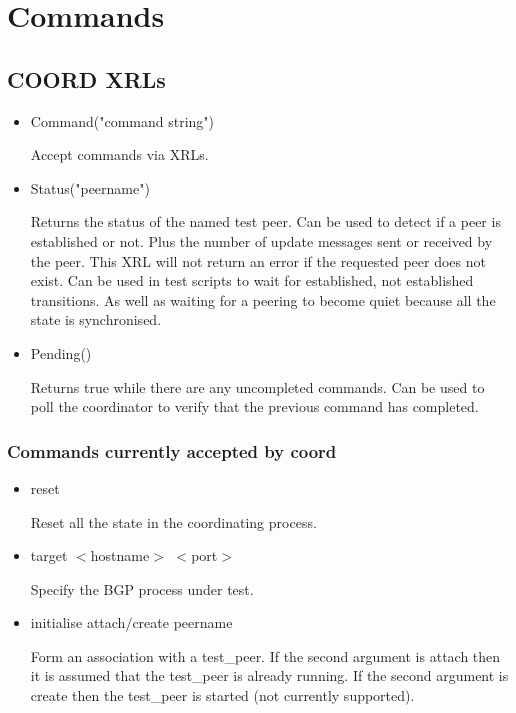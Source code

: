 \documentclass[11pt]{article}
\begin{document}
\section{Commands}

\subsection{\label{coord:command}COORD XRLs}
\begin{itemize}

\item Command("command string")

  Accept commands via XRLs.

\item Status("peername")

  Returns the status of the named test peer. Can be used to detect if a
  peer is established or not. Plus the number of update messages sent
  or received by the peer. This XRL will not return an error if the
  requested peer does not exist. Can be used in test scripts to wait
  for established, not established transitions. As well as waiting for
  a peering to become quiet because all the state is
  synchronised.

\item Pending()

  Returns true while there are any uncompleted commands. Can be used
  to poll the coordinator to verify that the previous command has
  completed.

\end{itemize}

\subsubsection{Commands currently accepted by coord}

\begin{itemize}

  \item {\sf reset}

  Reset all the state in the coordinating process.

  \item {\sf target $<$hostname$>$ $<$port$>$}

  Specify the BGP process under test.

  \item {\sf initialise attach$/$create peername}

  Form an association with a test\_peer. If the second argument is attach then
  it is assumed that the test\_peer is already running. If the second
  argument is create then the test\_peer is started (not currently
  supported).

\end{itemize}
\end{document}
